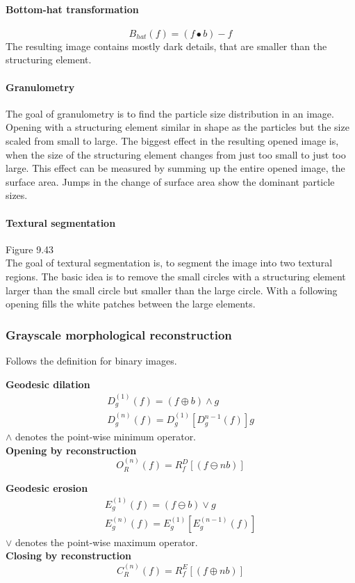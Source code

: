 \paragraph{Bottom-hat transformation}
\[
	B_{hat}(f) = (f \bullet b)-f
\]
The resulting image contains mostly dark details, that are smaller than the structuring element.
\paragraph{Granulometry}
The goal of granulometry is to find the particle size distribution in an image. Opening with a structuring element similar in shape as the particles but the size scaled from small to large. The biggest effect in the resulting opened image is, when the size of the structuring element changes from just too small to just too large. This effect can be measured by summing up the entire opened image, the surface area. Jumps in the change of surface area show the dominant particle sizes.
\paragraph{Textural segmentation}
Figure 9.43\\
The goal of textural segmentation is, to segment the image into two textural regions. The basic idea is to remove the small circles with a structuring element larger than the small circle but smaller than the large circle. With a following opening fills the white patches between the large elements.
\subsubsection{Grayscale morphological reconstruction}
Follows the definition for binary images.\\

\begin{multicols}{2}
\textbf{Geodesic dilation}
\begin{align*}
	D_g^{(1)}(f) = (f\oplus b)\wedge g\\
	D_g^{(n)}(f) = D_g^{(1)}[D_g^{n-1}(f)] g
\end{align*}
$\wedge$ denotes the point-wise minimum operator. \\

\textbf{Opening by reconstruction}
	\[
		O_R^{(n)} (f) = R_f^D \left[ (f \ominus nb) \right]
	\]

\textbf{Geodesic erosion}
\begin{align*}
	E_g^{(1)}(f) = (f\ominus b)\vee g\\
	E_g^{(n)}(f) = E_g^{(1)}[E_g^{(n-1)}(f)]
\end{align*}
$\vee$ denotes the point-wise maximum operator. \\

\textbf{Closing by reconstruction}
	\[
		C_R^{(n)} (f) = R_f^E \left[ (f \oplus nb) \right]
	\]
\end{multicols}
